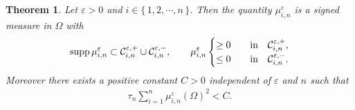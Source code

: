 \documentclass[12pt]{amsart}
\newtheorem{thm}{Theorem}[section]
\begin{document}
\begin{thm} \label{Radon-1}
Let ${\varepsilon}>0$ and $i \in \{\, 1, 2, \cdots, n \,\}$. 
Then the quantity $\mu^{\varepsilon}_{i,n}$ is a signed measure in $\Omega$ with 
\begin{align} \label{prop-mu-in-ve}
{\rm supp}\, \mu^{\varepsilon}_{i,n} \subset {\mathcal{C}}^{{\varepsilon},+}_{i,n} \cup {\mathcal{C}}^{{\varepsilon},-}_{i,n}, \qquad 
\mu^{\varepsilon}_{i,n} 
\begin{cases}
\ge 0 \quad & \text{in} \quad {\mathcal{C}}^{{\varepsilon},+}_{i,n}, \\
\le 0 \quad & \text{in} \quad {\mathcal{C}}^{{\varepsilon},-}_{i,n}. 
\end{cases}
\end{align} 
Moreover there exists a positive constant $C>0$ independent of ${\varepsilon}$ and $n$ such that 
\begin{align} \label{bdd-meas-1}
\tau_n \sum^{n}_{i=1} \mu^{\varepsilon}_{i,n}(\Omega)^2 < C. 
\end{align}
\end{thm}
\end{document}
